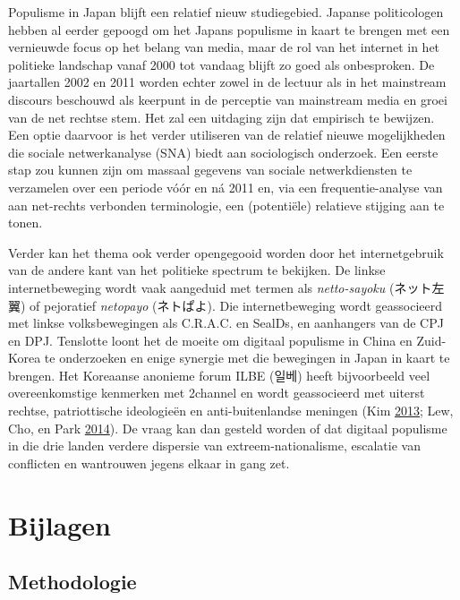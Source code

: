\documentclass[10.5pt,dutch,]{article}
\begin{document}
Populisme in Japan blijft een relatief nieuw studiegebied. Japanse
politicologen hebben al eerder gepoogd om het Japans populisme in kaart
te brengen met een vernieuwde focus op het belang van media, maar de rol
van het internet in het politieke landschap vanaf 2000 tot vandaag
blijft zo goed als onbesproken. De jaartallen 2002 en 2011 worden echter
zowel in de lectuur als in het mainstream discours beschouwd als
keerpunt in de perceptie van mainstream media en groei van de net
rechtse stem. Het zal een uitdaging zijn dat empirisch te bewijzen. Een
optie daarvoor is het verder utiliseren van de relatief nieuwe
mogelijkheden die sociale netwerkanalyse (SNA) biedt aan sociologisch
onderzoek. Een eerste stap zou kunnen zijn om massaal gegevens van
sociale netwerkdiensten te verzamelen over een periode vóór en ná 2011
en, via een frequentie-analyse van aan net-rechts verbonden
terminologie, een (potentiële) relatieve stijging aan te tonen.

Verder kan het thema ook verder opengegooid worden door het
internetgebruik van de andere kant van het politieke spectrum te
bekijken. De linkse internetbeweging wordt vaak aangeduid met termen als
\emph{netto-sayoku} (ネット左翼) of pejoratief \emph{netopayo}
(ネトぱよ). Die internetbeweging wordt geassocieerd met linkse
volksbewegingen als C.R.A.C. en SealDs, en aanhangers van de CPJ en DPJ.
Tenslotte loont het de moeite om digitaal populisme in China en
Zuid-Korea te onderzoeken en enige synergie met die bewegingen in Japan
in kaart te brengen. Het Koreaanse anonieme forum ILBE (일베) heeft
bijvoorbeeld veel overeenkomstige kenmerken met 2channel en wordt
geassocieerd met uiterst rechtse, patriottische ideologieën en
anti-buitenlandse meningen (Kim
\protect\hyperlink{ref-kimux5filbeux5f2013}{2013}; Lew, Cho, en Park
\protect\hyperlink{ref-lewux5fpoliticizationux5f2014}{2014}). De vraag
kan dan gesteld worden of dat digitaal populisme in die drie landen
verdere dispersie van extreem-nationalisme, escalatie van conflicten en
wantrouwen jegens elkaar in gang zet.

\newpage

\appendix

\section{Bijlagen}\label{bijlagen}

\subsection{Methodologie}\label{methodologie}
\end{document}
